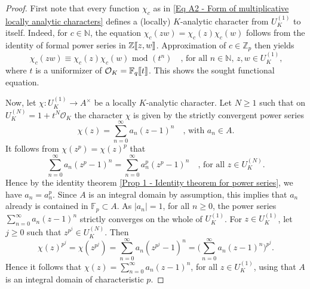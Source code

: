 \documentclass[a4paper, reqno, 10pt]{amsart}
\theoremstyle{definition}
\numberwithin{equation}{section}
\newcommand{\abs}[1]{{\lvert{#1}\rvert}}
\renewcommand{\mod}{{\,\,\mathrm{mod}\,\,}}
\newcommand{\ra}{\rightarrow}
\newcommand{\unts}{^{\times}}
\newcommand{\llrrbracket}[1]{\mkern-3mu\left[\mkern-2.5mu\left[#1\right]\mkern-2.5mu\right]}
\newcommand{\BF}{{\mathbb {F}}}
\newcommand{\BN}{{\mathbb {N}}}
\newcommand{\BZ}{{\mathbb {Z}}}
\newcommand{\CO}{{\mathcal {O}}}
\begin{document}
\begin{proof}
	First note that every function $\chi_c$ as in \eqref{Eq A2 - Form of multiplicative locally analytic characters} defines a (locally) $K$-analytic character from $U_K^{(1)}$ to itself.
	Indeed, for $c\in \BN$, the equation $\chi_c(zw)=\chi_c(z)\chi_c(w)$ follows from the identity of formal power series in $\BZ\llrrbracket{z,w}$.
	Approximation of $c\in \BZ_p$ then yields 
	\begin{equation*} 
		\chi_c(zw) \equiv \chi_c(z) \chi_c(w) \mod (t^n) \quad\text{, for all $n \in \BN$, $z,w \in U_K^{(1)}$,}
	\end{equation*}
	where $t$ is a uniformizer of $\CO_K = \BF_q \llrrbracket{t}$.
	This shows the sought functional equation.
	
	
	Now, let $\chi \colon U_K^{(1)} \ra A\unts$ be a locally $K$-analytic character.
	Let $N \geq 1$ such that on $U_K^{(N)} = 1 + t^N \CO_K$ the character $\chi$ is given by the strictly convergent power series
	\[\chi(z)= \sum_{n=0}^{\infty} a_n (z-1)^n \quad\text{, with $a_n \in A$.} \]
	It follows from $\chi(z^p) = \chi(z)^p$ that
	\[\sum_{n=0}^{\infty} a_n (z^p-1)^n = \sum_{n=0}^{\infty} a_n^p (z^p -1)^n  \quad\text{, for all $z\in U_K^{(N)}$.} \]
	Hence by the identity theorem \ref{Prop 1 - Identity theorem for power series}, we have $a_n = a_n^p$.
	Since $A$ is an integral domain by assumption, this implies that $a_n$ already is contained in $\BF_p \subset A$.
	As $\abs{a_n}=1$, for all $n\geq 0$, the power series $\sum_{n=0}^{\infty} a_n (z-1)^n$ strictly converges on the whole of $U_K^{(1)}$.
	For $z\in U_K^{(1)}$, let $j\geq 0$ such that $z^{p^j} \in U_K^{(N)}$.
	Then 
	\[\chi(z)^{p^j} = \chi(z^{p^j}) = \sum_{n=0}^{\infty} a_n (z^{p^j} - 1)^n = \bigg( \sum_{n=0}^{\infty} a_n (z-1)^n \bigg)^{p^j} . \]
	Hence it follows that $\chi(z) = \sum_{n=0}^{\infty} a_n (z-1)^n$, for all $z \in U_K^{(1)}$, using that $A$ is an integral domain of characteristic $p$.
	

\end{proof}
\end{document}
